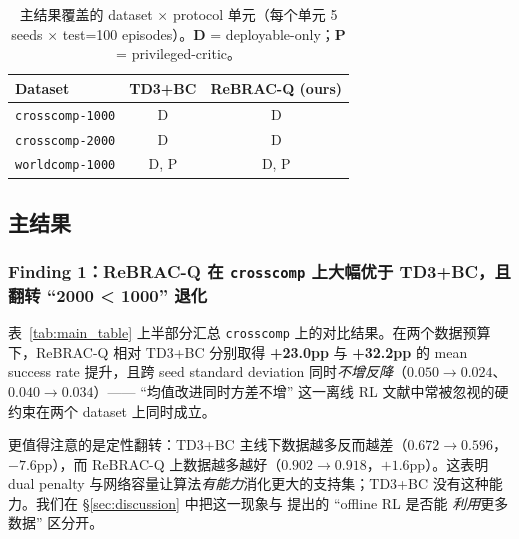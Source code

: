 \begin{table}[t]
\centering
\small
\caption{主结果覆盖的 dataset $\times$ protocol 单元（每个单元 5 seeds $\times$ test=100 episodes）。\textbf{D} = deployable-only；\textbf{P} = privileged-critic。}
\label{tab:protocol_matrix}
\begin{tabular}{lcc}
\toprule
\textbf{Dataset} & \textbf{TD3+BC} & \textbf{ReBRAC-Q (ours)} \\
\midrule
\texttt{crosscomp-1000} & D & D \\
\texttt{crosscomp-2000} & D & D \\
\texttt{worldcomp-1000} & D, P & D, P \\
\bottomrule
\end{tabular}
\end{table}

\subsection{主结果}
\label{subsec:main_results}

\subsubsection{Finding 1：ReBRAC-Q 在 \texttt{crosscomp} 上大幅优于 TD3+BC，且翻转 ``2000 < 1000'' 退化}
\label{subsubsec:finding_1}

表~\ref{tab:main_table} 上半部分汇总 \texttt{crosscomp} 上的对比结果。在两个数据预算下，ReBRAC-Q 相对 TD3+BC 分别取得 \textbf{+23.0pp} 与 \textbf{+32.2pp} 的 mean success rate 提升，且跨 seed standard deviation 同时\emph{不增反降}（$0.050 \to 0.024$、$0.040 \to 0.034$）—— ``均值改进同时方差不增'' 这一离线 RL 文献中常被忽视的硬约束在两个 dataset 上同时成立。

更值得注意的是定性翻转：TD3+BC 主线下数据越多反而越差（$0.672 \to 0.596$，$-7.6$pp），而 ReBRAC-Q 上数据越多越好（$0.902 \to 0.918$，$+1.6$pp）。这表明 dual penalty 与网络容量让算法\emph{有能力}消化更大的支持集；TD3+BC 没有这种能力。我们在 \S\ref{sec:discussion} 中把这一现象与 \citet{tarasov2023rebrac} 提出的 ``offline RL 是否能 \emph{利用}更多数据'' 区分开。

